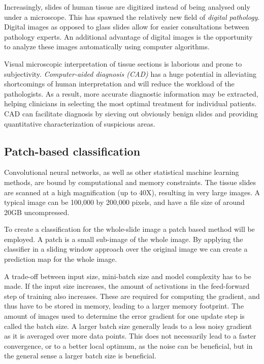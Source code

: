 \documentclass[journal]{IEEEtran}
\begin{document}
Increasingly, slides of human tissue are digitized instead of being analysed only under a microscope. This has spawned the relatively new field of \emph{digital pathology}. Digital images as opposed to glass slides allow for  easier consultations between pathology experts. An additional advantage of digital images is the opportunity to analyze these images automatically using computer algorithms.

Visual microscopic interpretation of tissue sections is laborious and prone to subjectivity. \emph{Computer-aided diagnosis (CAD)} has a huge potential in alleviating shortcomings of human interpretation and will reduce the workload of the pathologists. As a result, more accurate diagnostic information may be extracted, helping clinicians in selecting the most optimal treatment for individual patients. CAD can facilitate diagnosis by sieving out obviously benign slides and providing quantitative characterization of suspicious areas.


\subsection{Patch-based classification}

Convolutional neural networks, as well as other statistical machine learning methods, are bound by computational and memory constraints. The tissue slides are scanned at a high magnification (up to 40X), resulting in very large images. A typical image can be 100,000 by 200,000 pixels, and have a file size of around 20GB uncompressed. 

To create a classification for the whole-slide image a patch based method will be employed. A patch is a small sub-image of the whole image. By applying the classifier in a sliding window approach over the original image we can create a prediction map for the whole image.

A trade-off between input size, mini-batch size and model complexity has to be made. If the input size increases, the amount of activations in the feed-forward step of training also increases. These are required for computing the gradient, and thus have to be stored in memory, leading to a larger memory footprint. The amount of images used to determine the error gradient for one update step is called the batch size. A larger batch size generally leads to a less noisy gradient as it is averaged over more data points. This does not necessarily lead to a faster convergence, or to a better local optimum, as the noise can be beneficial, but in the general sense a larger batch size is beneficial. 
\end{document}

